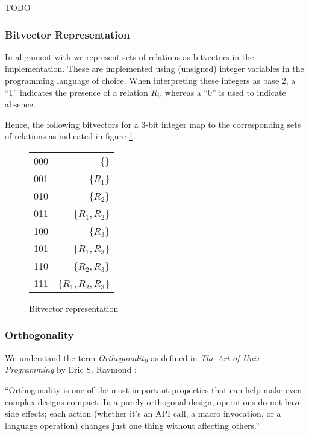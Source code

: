TODO

\subsubsection{Bitvector Representation}
\label{subsub:basics-bitvector}

In alignment with \cite{moerkotte2009building} we represent sets of relations as bitvectors in the implementation. These are implemented using (unsigned) integer variables in the programming language of choice. When interpreting these integers as base 2, a ``1'' indicates the presence of a relation $R_i$, whereas a ``0'' is used to indicate absence.

\begin{example}
    Hence, the following bitvectors for a 3-bit integer map to the corresponding sets of relations as indicated in figure \ref{fig:bitvector}.
    \begin{figure}[H]
        \begin{tabular}{ c | r }
            000 & \{\} \\ 
            001 & \{$R_1$\} \\
            010 & \{$R_2$\} \\
            011 & \{$R_1,R_2$\} \\
            100 & \{$R_3$\} \\
            101 & \{$R_1,R_3$\} \\
            110 & \{$R_2,R_3$\} \\
            111 & \{$R_1,R_2,R_3$\} \\
           \end{tabular}
        \caption{Bitvector representation}
        \label{fig:bitvector}
    \end{figure}
\end{example}

\subsubsection{Orthogonality}
We understand the term \textit{Orthogonality} as defined in \textit{The Art of Unix Programming} by Eric S. Raymond \cite{raymond2003compactness}:
\begin{definition}
    ``Orthogonality is one of the most important properties that can help make even complex designs compact. In a purely orthogonal design, operations do not have side effects; each action (whether it's an API call, a macro invocation, or a language operation) changes just one thing without affecting others.''
\end{definition}

